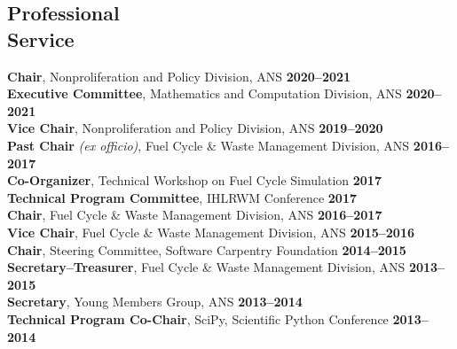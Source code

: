 \documentclass[margin,line]{resume}
\begin{document}
\begin{resume}
    \section{\mysidestyle Professional\\Service}
                \textbf{Chair}, Nonproliferation and Policy Division, ANS  \hfill \textbf{2020--2021}\vspace{.5mm}\\%
                \textbf{Executive Committee}, Mathematics and Computation Division, ANS  \hfill \textbf{2020--2021}\vspace{.5mm}\\%
                \textbf{Vice Chair}, Nonproliferation and Policy Division, ANS  \hfill \textbf{2019--2020}\vspace{.5mm}\\%
    \textbf{Past Chair} \emph{(ex officio)}, Fuel Cycle \& Waste Management Division, ANS  \hfill \textbf{2016--2017}\vspace{.5mm}\\%
                \textbf{Co-Organizer}, Technical Workshop on Fuel Cycle Simulation \hfill \textbf{2017}\vspace{.5mm}\\%
                \textbf{Technical Program Committee}, IHLRWM Conference \hfill \textbf{2017}\vspace{.5mm}\\%
                \textbf{Chair}, Fuel Cycle \& Waste Management Division, ANS  \hfill \textbf{2016--2017}\vspace{.5mm}\\%
                \textbf{Vice Chair}, Fuel Cycle \& Waste Management Division, ANS  \hfill \textbf{2015--2016}\vspace{.5mm}\\%
                \textbf{Chair}, Steering Committee, Software Carpentry Foundation   \hfill \textbf{2014--2015}\vspace{.5mm}\\%
                \textbf{Secretary--Treasurer}, Fuel Cycle \& Waste Management Division, ANS  \hfill \textbf{2013--2015}\vspace{.5mm}\\%
                \textbf{Secretary}, Young Members Group, ANS  \hfill \textbf{2013--2014}\vspace{.5mm}\\%
                \textbf{Technical Program Co-Chair}, SciPy, Scientific Python Conference   \hfill \textbf{2013--2014}\vspace{.5mm}\\%

\end{resume}
\end{document}
